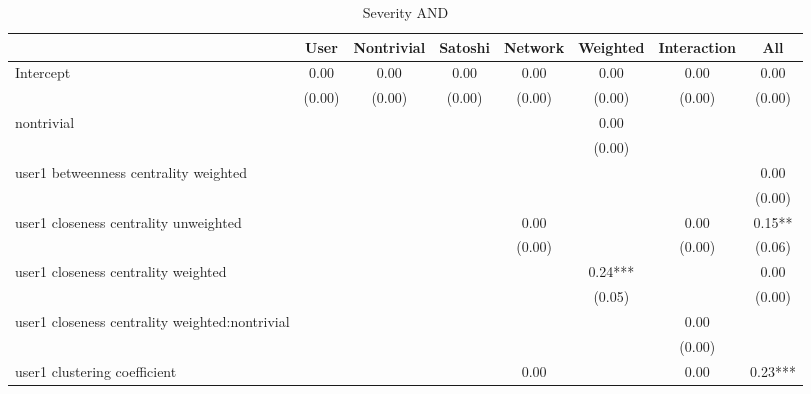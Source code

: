 \begin{table*}
\centering
\caption{Severity AND}
\begin{center}
\begin{tabular}{lccccccc}
\hline
                                               & User    & Nontrivial & Satoshi & Network & Weighted & Interaction &   All    \\
\hline
Intercept                                      & 0.00     & 0.00       & 0.00    & 0.00    & 0.00     & 0.00               & 0.00     \\
                                               & (0.00)   & (0.00)     & (0.00)  & (0.00)  & (0.00)   & (0.00)             & (0.00)   \\
nontrivial                                     &          &            &         &         & 0.00     &                    &          \\
                                               &          &            &         &         & (0.00)   &                    &          \\
user1 betweenness centrality weighted          &          &            &         &         &          &                    & 0.00     \\
                                               &          &            &         &         &          &                    & (0.00)   \\
user1 closeness centrality unweighted          &          &            &         & 0.00    &          & 0.00               & 0.15**   \\
                                               &          &            &         & (0.00)  &          & (0.00)             & (0.06)   \\
user1 closeness centrality weighted            &          &            &         &         & 0.24***  &                    & 0.00     \\
                                               &          &            &         &         & (0.05)   &                    & (0.00)   \\
user1 closeness centrality weighted:nontrivial &          &            &         &         &          & 0.00               &          \\
                                               &          &            &         &         &          & (0.00)             &          \\
user1 clustering coefficient                   &          &            &         & 0.00    &          & 0.00               & 0.23***  \\

\end{tabular}
\end{center}
\end{table*}
